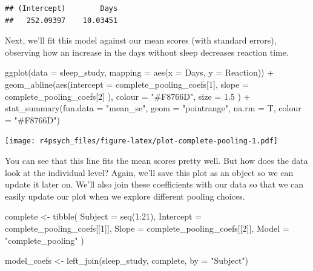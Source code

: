 \documentclass[
]{book}
\newenvironment{Shaded}{\begin{snugshade}}{\end{snugshade}}
\newcommand{\AttributeTok}[1]{\textcolor[rgb]{0.77,0.63,0.00}{#1}}
\newcommand{\DecValTok}[1]{\textcolor[rgb]{0.00,0.00,0.81}{#1}}
\newcommand{\FloatTok}[1]{\textcolor[rgb]{0.00,0.00,0.81}{#1}}
\newcommand{\FunctionTok}[1]{\textcolor[rgb]{0.00,0.00,0.00}{#1}}
\newcommand{\NormalTok}[1]{#1}
\newcommand{\OtherTok}[1]{\textcolor[rgb]{0.56,0.35,0.01}{#1}}
\newcommand{\SpecialCharTok}[1]{\textcolor[rgb]{0.00,0.00,0.00}{#1}}
\newcommand{\StringTok}[1]{\textcolor[rgb]{0.31,0.60,0.02}{#1}}
\begin{document}
\begin{verbatim}
## (Intercept)        Days 
##   252.09397    10.03451
\end{verbatim}

Next, we'll fit this model against our mean scores (with standard errors), observing how an increase in the days without sleep decreases reaction time.

\begin{Shaded}
\begin{Highlighting}[]
\FunctionTok{ggplot}\NormalTok{(}\AttributeTok{data =}\NormalTok{ sleep\_study, }\AttributeTok{mapping =} \FunctionTok{aes}\NormalTok{(}\AttributeTok{x =}\NormalTok{ Days, }\AttributeTok{y =}\NormalTok{ Reaction)) }\SpecialCharTok{+}
  \FunctionTok{geom\_abline}\NormalTok{(}\FunctionTok{aes}\NormalTok{(}\AttributeTok{intercept =}\NormalTok{ complete\_pooling\_coefs[}\DecValTok{1}\NormalTok{], }
                  \AttributeTok{slope =}\NormalTok{ complete\_pooling\_coefs[}\DecValTok{2}\NormalTok{]}
\NormalTok{                  ),}
              \AttributeTok{colour =} \StringTok{"\#F8766D"}\NormalTok{,}
              \AttributeTok{size =} \FloatTok{1.5}
\NormalTok{              ) }\SpecialCharTok{+}
  \FunctionTok{stat\_summary}\NormalTok{(}\AttributeTok{fun.data =} \StringTok{"mean\_se"}\NormalTok{, }
               \AttributeTok{geom =} \StringTok{"pointrange"}\NormalTok{,}
               \AttributeTok{na.rm =}\NormalTok{ T,}
               \AttributeTok{colour =} \StringTok{"\#F8766D"}\NormalTok{)}
\end{Highlighting}
\end{Shaded}

\texttt{[image: r4psych\_files/figure-latex/plot-complete-pooling-1.pdf]}

You can see that this line fits the mean scores pretty well. But how does the data look at the individual level? Again, we'll save this plot as an object so we can update it later on. We'll also join these coefficients with our data so that we can easily update our plot when we explore different pooling choices.

\begin{Shaded}
\begin{Highlighting}[]
\NormalTok{complete }\OtherTok{\textless{}{-}} \FunctionTok{tibble}\NormalTok{(}
  \AttributeTok{Subject =} \FunctionTok{seq}\NormalTok{(}\DecValTok{1}\SpecialCharTok{:}\DecValTok{21}\NormalTok{),}
  \AttributeTok{Intercept =}\NormalTok{ complete\_pooling\_coefs[[}\DecValTok{1}\NormalTok{]],}
  \AttributeTok{Slope =}\NormalTok{ complete\_pooling\_coefs[[}\DecValTok{2}\NormalTok{]],}
  \AttributeTok{Model =} \StringTok{"complete\_pooling"}
\NormalTok{  )}

\NormalTok{model\_coefs }\OtherTok{\textless{}{-}} \FunctionTok{left\_join}\NormalTok{(sleep\_study, complete, }\AttributeTok{by =} \StringTok{"Subject"}\NormalTok{)}
\end{Highlighting}
\end{Shaded}
\end{document}

